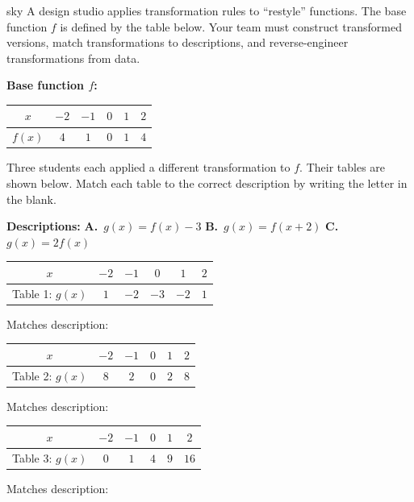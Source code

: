 \documentclass[10pt]{article}
\begin{document}
\namepartnerperiod

\vspace{0.08in}

\begin{scenariobox}{sky}
\small
A design studio applies transformation rules to ``restyle'' functions. The base function $f$
is defined by the table below. Your team must construct transformed versions, match
transformations to descriptions, and reverse-engineer transformations from data.

\medskip
\textbf{Base function $f$:}
\renewcommand{\arraystretch}{1.2}
\begin{tabular}{|c|c|c|c|c|c|}
\hline
$x$    & $-2$ & $-1$ & $0$ & $1$ & $2$ \\
\hline
$f(x)$ & $4$  & $1$  & $0$ & $1$ & $4$ \\
\hline
\end{tabular}
\end{scenariobox}

\vspace{0.08in}

\begin{tcolorbox}[colback=white, colframe=black!40,
    title=\textbf{Tier R --- Remediate},
    fonttitle=\bfseries, arc=2mm, left=3mm, right=3mm, top=2mm, bottom=2mm]

Three students each applied a different transformation to $f$. Their tables are shown below.
Match each table to the correct description by writing the letter in the blank.

\medskip
\textbf{Descriptions:} \quad
\textbf{A.}\ $g(x) = f(x) - 3$ \qquad
\textbf{B.}\ $g(x) = f(x+2)$ \qquad
\textbf{C.}\ $g(x) = 2f(x)$

\medskip
\renewcommand{\arraystretch}{1.25}
\begin{tabular}{|c|c|c|c|c|c|}
\hline
$x$    & $-2$ & $-1$ & $0$ & $1$ & $2$ \\
\hline
Table 1: $g(x)$ & $1$ & $-2$ & $-3$ & $-2$ & $1$ \\
\hline
\end{tabular}
\quad Matches description: \blank{1.5cm}

\medskip
\begin{tabular}{|c|c|c|c|c|c|}
\hline
$x$    & $-2$ & $-1$ & $0$ & $1$ & $2$ \\
\hline
Table 2: $g(x)$ & $8$ & $2$ & $0$ & $2$ & $8$ \\
\hline
\end{tabular}
\quad Matches description: \blank{1.5cm}

\medskip
\begin{tabular}{|c|c|c|c|c|c|}
\hline
$x$    & $-2$ & $-1$ & $0$ & $1$ & $2$ \\
\hline
Table 3: $g(x)$ & $0$ & $1$ & $4$ & $9$ & $16$ \\
\hline
\end{tabular}
\quad Matches description: \blank{1.5cm}

\end{tcolorbox}
\end{document}
